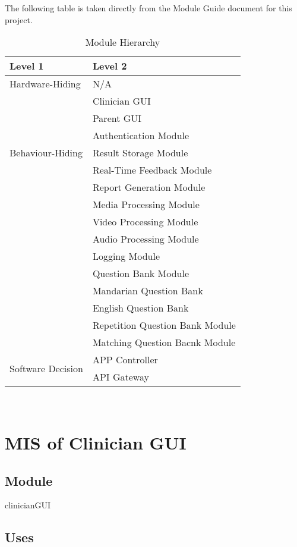 \documentclass[12pt, titlepage]{article}
\begin{document}
The following table is taken directly from the Module Guide document for this project.

\begin{table}[h!]
\centering
\begin{tabular}{p{} p{}}
\toprule
\textbf{Level 1} & \textbf{Level 2}\\
\midrule

{Hardware-Hiding} & N/A \\
\midrule

\multirow{7}{0.3\textwidth}{Behaviour-Hiding} & Clinician GUI\\
& Parent GUI\\
& Authentication Module\\
& Result Storage Module\\
& Real-Time Feedback Module\\ 
& Report Generation Module\\
& Media Processing Module\\
& Video Processing Module\\
& Audio Processing Module\\
& Logging Module\\
& Question Bank Module\\
& Mandarian Question Bank\\
& English Question Bank\\
& Repetition Question Bank Module\\
& Matching Question Bacnk Module\\
\midrule

\multirow{3}{0.3\textwidth}{Software Decision} & {APP Controller}\\
& API Gateway\\
\bottomrule

\end{tabular}
\caption{Module Hierarchy}
\label{TblMH}
\end{table}

~\newpage
\section{MIS of Clinician GUI \label{mClinicianGUI} }

\subsection{Module}

clinicianGUI

\subsection{Uses}
\end{document}
